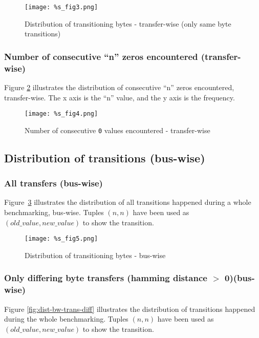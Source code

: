 \documentclass[a4paper,12pt]{article}
\begin{document}
{{{{{{{{{{{{{{{{{{\begin{figure}[H]
		\centering
		\texttt{[image: \%s\_fig3.png]}
		\caption{Distribution of transitioning bytes - 
                  transfer-wise (only same byte transitions)}
		\label{fig:dist-tw-trans-same}
\end{figure}	

\pagebreak
\subsubsection{Number of consecutive ``n'' zeros encountered (transfer-wise)}
Figure \ref{fig:consec-zeros-tw} illustrates the distribution of
consecutive ``n'' zeros encountered, transfer-wise. The x axis is
the ``n'' value, and the y axis is the frequency.

\begin{figure}[H]
		\centering
		\texttt{[image: \%s\_fig4.png]}
		\caption{Number of consecutive \texttt{0} values encountered - 
                  transfer-wise}
		\label{fig:consec-zeros-tw}
\end{figure}






\pagebreak
\subsection{Distribution of transitions (bus-wise)}
\subsubsection{All transfers (bus-wise)}
Figure~\ref{fig:dist-bw-trans} illustrates the distribution of all 
transitions happened during a whole benchmarking, bus-wise. Tuples $(n,n)$ 
have been used as $(old\_value, new\_value)$ to show the transition.

\begin{figure}[H]
		\centering
		\texttt{[image: \%s\_fig5.png]}
		\caption{Distribution of transitioning bytes - bus-wise}
		\label{fig:dist-bw-trans}
\end{figure}	

\pagebreak
\subsubsection{Only differing byte transfers (hamming distance $>$ 0)(bus-wise)}
Figure \ref{fig:dist-bw-trans-diff} illustrates the distribution of 
transitions happened during the whole benchmarking. Tuples $(n,n)$ 
have been used as $(old\_value, new\_value)$ to show the transition.

}}}}}}}}}}}}}}}}}}
\end{document}
